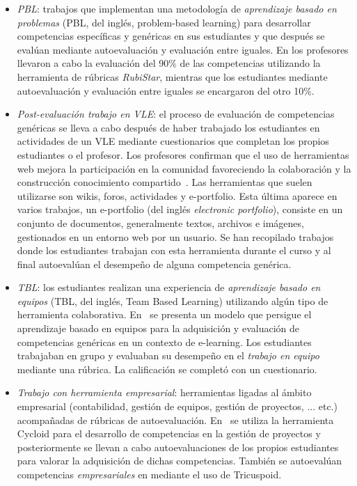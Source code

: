 \begin{itemize}
\item \emph{PBL}: trabajos que implementan una metodología de \emph{aprendizaje basado en problemas} (PBL, del inglés, problem-based learning) para desarrollar competencias específicas y genéricas en sus estudiantes y que después se evalúan mediante autoevaluación y evaluación entre iguales. En \cite{lasa2013problem} los profesores llevaron a cabo la evaluación del 90\% de las competencias utilizando la herramienta de rúbricas \emph{RubiStar}, mientras que los estudiantes mediante autoevaluación y evaluación entre iguales se encargaron del otro 10\%. 
\item \emph{Post-evaluación trabajo en VLE}:  el proceso de evaluación de competencias genéricas se lleva a cabo después de haber trabajado los estudiantes en actividades de un VLE mediante cuestionarios que completan los propios estudiantes o el profesor. Los profesores confirman que el uso de herramientas web mejora la participación en la comunidad favoreciendo la colaboración y la construcción conocimiento compartido~\cite{starcic2008sustaining}. Las herramientas que suelen utilizarse son wikis, foros, actividades y e-portfolio. Esta última aparece en varios trabajos, un e-portfolio (del inglés \emph{electronic portfolio}), consiste en un conjunto de documentos, generalmente textos, archivos e imágenes, gestionados en un entorno web por un usuario. Se han recopilado trabajos donde los estudiantes trabajan con esta herramienta durante el curso y al final autoevalúan el desempeño de alguna competencia genérica\cite{arno2011promoting}. 
\item \emph{TBL}: los estudiantes realizan una experiencia de \emph{aprendizaje basado en equipos} (TBL, del inglés, Team Based Learning) utilizando algún tipo de herramienta colaborativa. En~\cite{ficapal2015learning} se presenta un modelo que persigue el aprendizaje basado en equipos para la adquisición y evaluación de competencias genéricas en un contexto de e-learning. Los estudiantes trabajaban en grupo y evaluaban su desempeño en el \emph{trabajo en equipo} mediante una rúbrica. La calificación se completó con un cuestionario.
\item \emph{Trabajo con herramienta empresarial}: herramientas ligadas al ámbito empresarial (contabilidad, gestión de equipos, gestión de proyectos, ... etc.) acompañadas de rúbricas de autoevaluación.  En~\cite{chang2009international} se utiliza la herramienta Cycloid para el desarrollo de competencias en la gestión de proyectos y posteriormente se llevan a cabo autoevaluaciones de los propios estudiantes para valorar la adquisición de dichas competencias. También se autoevalúan competencias \emph{empresariales} en  \cite{achcaoucaou2014competence} mediante el uso de Tricuspoid. 

\end{itemize}
